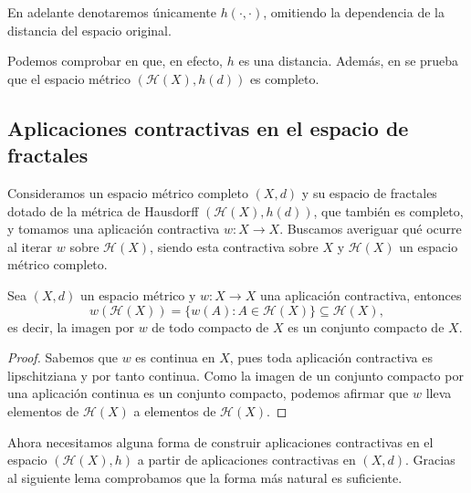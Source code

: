 En adelante denotaremos únicamente $h(\cdot,\cdot)$, omitiendo la dependencia de la distancia del espacio original.

Podemos comprobar en \cite[Sección 2.6]{Barnsley} que, en efecto, $h$ es una distancia. Además, en \cite[Sección 2.7]{Barnsley} se prueba que el espacio métrico $(\mathcal{H}(X), h(d))$ es completo.

\subsection{Aplicaciones contractivas en el espacio de fractales}

Consideramos un espacio métrico completo $(X,d)$ y su espacio de fractales dotado de la métrica de Hausdorff $(\mathcal H(X), h(d))$, que también es completo, y tomamos una aplicación contractiva $w:X\longrightarrow X$. Buscamos averiguar qué ocurre al iterar $w$ sobre $\mathcal{H}(X)$, siendo esta contractiva sobre $X$ y $\mathcal{H}(X)$ un espacio métrico completo. 

\begin{lema}
    \label{lema:contractivas-compactos}
    Sea $(X,d)$ un espacio métrico y $w:X\longrightarrow X$ una aplicación contractiva, entonces 
    $$w(\mathcal{H}(X))=\{w(A):A\in\mathcal{H}(X)\}\subseteq\mathcal{H}(X),$$
    es decir, la imagen por $w$ de todo compacto de $X$ es un conjunto compacto de $X$.
\end{lema}
\begin{proof}
    Sabemos que $w$ es continua en $X$, pues toda aplicación contractiva es lipschitziana y por tanto continua. Como la imagen de un conjunto compacto por una aplicación continua es un conjunto compacto, podemos afirmar que $w$ lleva elementos de $\mathcal{H}(X)$ a elementos de $\mathcal{H}(X)$.
\end{proof}

Ahora necesitamos alguna forma de construir aplicaciones contractivas en el espacio $(\mathcal{H}(X),h)$ a partir de aplicaciones contractivas en $(X,d)$. Gracias al siguiente lema comprobamos que la forma más natural es suficiente.


